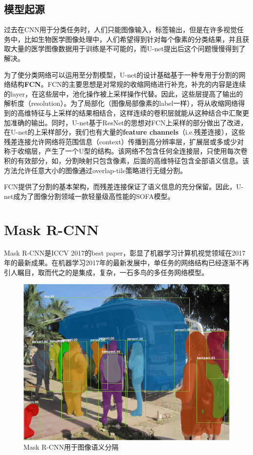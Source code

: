 \subsection{模型起源}\label{ux6a21ux578bux8d77ux6e90}

过去在CNN用于分类任务时，人们只能图像输入，标签输出，但是在许多视觉任务中，比如生物医学图像处理中，人们希望得到针对每个像素的分类结果，并且获取大量的医学图像数据用于训练是不可能的，而U-net提出后这个问题慢慢得到了解决。

为了使分类网络可以运用至分割模型，U-net的设计基础基于一种专用于分割的网络结构\textbf{FCN}。FCN的主要思想是对常规的收缩网络进行补充，补充的内容是连续的layer，在这些层中，池化操作被上采样操作代替。因此，这些层提高了输出的解析度（resolution）。为了局部化（图像局部像素的label一样），将从收缩网络得到的高维特征与上采样的结果相结合，这样连续的卷积层就能从这种结合中汇聚更加准确的输出。同时，U-net基于ResNet的思想对FCN上采样的部分做出了改进，在U-net的上采样部分，我们也有大量的\textbf{feature
channels}（i.e.残差连接），这些残差连接允许网络将范围信息（context）传播到高分辨率层，扩展层或多或少对称于收缩层，产生了一个U型的结构。该网络不包含任何全连接层，只使用每次卷积的有效部分，如，分割映射只包含像素，后面的高维特征包含全部语义信息。该方法允许任意大小的图像通过overlap-tile策略进行无缝分割。

FCN提供了分割的基本架构，而残差连接保证了语义信息的充分保留。因此，U-net成为了图像分割领域一款轻量级高性能的SOFA模型。

\section{Mask R-CNN}\label{mask-r-cnn}

Mask R-CNN是ICCV 2017的best
paper，彰显了机器学习计算机视觉领域在2017年的最新成果。在机器学习2017年的最新发展中，单任务的网络结构已经逐渐不再引人瞩目，取而代之的是集成，复杂，一石多鸟的多任务网络模型。

\begin{figure}[htbp]
\centering
\includegraphics[width=0.8\linewidth]{body/theory_pic/1}
\caption{Mask R-CNN用于图像语义分隔}
\label{fig::theory11}
\end{figure}

